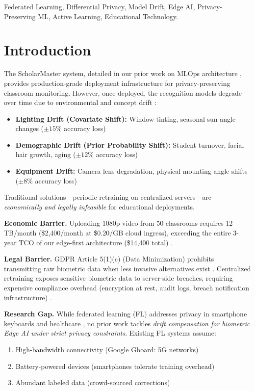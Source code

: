 \documentclass[conference]{IEEEtran}
\begin{document}
\begin{IEEEkeywords}
Federated Learning, Differential Privacy, Model Drift, Edge AI, Privacy-Preserving ML, Active Learning, Educational Technology.
\end{IEEEkeywords}

\section{Introduction}

The ScholarMaster system, detailed in our prior work on MLOps architecture \cite{b1}, provides production-grade deployment infrastructure for privacy-preserving classroom monitoring. However, once deployed, the recognition models degrade over time due to environmental and concept drift \cite{b2}:



\begin{itemize}
    \item \textbf{Lighting Drift (Covariate Shift):} Window tinting, seasonal sun angle changes ($\pm 15$\% accuracy loss)
    \item \textbf{Demographic Drift (Prior Probability Shift):} Student turnover, facial hair growth, aging ($\pm 12$\% accuracy loss)
    \item \textbf{Equipment Drift:} Camera lens degradation, physical mounting angle shifts ($\pm 8$\% accuracy loss)
\end{itemize}

Traditional solutions—periodic retraining on centralized servers—are \textit{economically and legally infeasible} for educational deployments.

\textbf{Economic Barrier.} Uploading 1080p video from 50 classrooms requires 12 TB/month (\$2,400/month at \$0.20/GB cloud ingress), exceeding the entire 3-year TCO of our edge-first architecture (\$14,400 total) \cite{b3}.

\textbf{Legal Barrier.} GDPR Article 5(1)(c) (Data Minimization) prohibits transmitting raw biometric data when less invasive alternatives exist \cite{b4}. Centralized retraining exposes sensitive biometric data to server-side breaches, requiring expensive compliance overhead (encryption at rest, audit logs, breach notification infrastructure) \cite{b5}.

\textbf{Research Gap.} While federated learning (FL) addresses privacy in smartphone keyboards \cite{b6} and healthcare \cite{b7}, no prior work tackles \textit{drift compensation for biometric Edge AI under strict privacy constraints}. Existing FL systems assume:
\begin{enumerate}
    \item High-bandwidth connectivity (Google Gboard: 5G networks) \cite{b8}
    \item Battery-powered devices (smartphones tolerate training overhead)
    \item Abundant labeled data (crowd-sourced corrections)
\end{enumerate}
\end{document}
